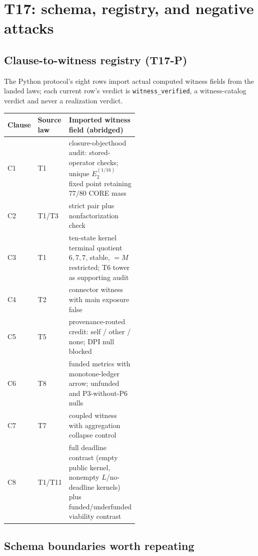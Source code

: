 \documentclass[11pt]{article}
\theoremstyle{definition}
\begin{document}
 \section{T17: schema, registry, and negative attacks}
\label{app:t17}


\subsection{Clause-to-witness registry (T17-P)}

The Python protocol's eight rows import actual computed witness fields from
the landed laws; each current row's verdict is \texttt{witness\_verified},
a witness-catalog verdict and never a realization verdict.

\begin{center}\small
\begin{tabular}{llp{0.52\linewidth}}
\toprule
Clause & Source law & Imported witness field (abridged) \\
\midrule
C1 & T1 & closure-objecthood audit: stored-operator checks; unique
$E_2^{(1/16)}$ fixed point retaining $77/80$ CORE mass \\
C2 & T1/T3 & strict pair plus nonfactorization check \\
C3 & T1 & ten-state kernel terminal quotient $6,7,7$, stable, $= M$
restricted; T6 tower as supporting audit \\
C4 & T2 & connector witness with main exposure false \\
C5 & T5 & provenance-routed credit: self / other / none; DPI null blocked \\
C6 & T8 & funded metrics with monotone-ledger arrow; unfunded and
P3-without-P6 nulls \\
C7 & T7 & coupled witness with aggregation collapse control \\
C8 & T1/T11 & full deadline contrast (empty public kernel, nonempty
$L$/no-deadline kernels) plus funded/underfunded viability contrast \\
\bottomrule
\end{tabular}
\end{center}

\subsection{Schema boundaries worth repeating}
\end{document}
